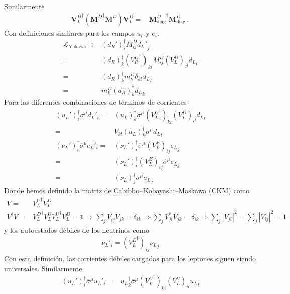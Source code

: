 \begin{frame}
 Similarmente
\begin{align}
  {\mathbf{V}_L^D}^\dagger \left({\mathbf{M}^D}^\dagger\mathbf{M}^D\right)\mathbf{V}_L^D=& 
  {\mathbf{M}^D_{\text{diag}}}^\dagger{\mathbf{M}^D_{\text{diag}}}\,,
\end{align}
Con definiciones similares para los campos $u_i$ y $e_i$.
\begin{align}
\mathcal{L}_{\text{Yukawa}}\supset&(d_R')^{\dagger}_iM^D_{ij} {d_L'}_j\nonumber\\
=&(d_R)^{\dagger}_k({V^D_R}^\dagger)_{ki}M^D_{ij}(V^D_L)_{jl} {d_L}_l\nonumber\\
=&(d_R)^{\dagger}_km^D_k\delta_{kl} {d_L}_l\nonumber\\
=&m^D_k(d_R)^{\dagger}_k{d_L}_k
\end{align}
Para las diferentes combinaciones de términos de corrientes
\begin{align}
  (u_L')^{\dagger}_i \overline{\sigma}^\mu{d_L}'_i=&(u_L)^{\dagger}_k\overline{\sigma}^\mu({V^U_L}^\dagger)_{ki}(V^D_L)_{il} {d_L}_l\nonumber\\
  =&V_{kl}(u_L)^{\dagger}_k\overline{\sigma}^\mu{d_L}_l\nonumber\\
  (\nu_L')^{\dagger}_i\overline{\sigma}^\mu {e_L}'_i=&(\nu_L')^{\dagger}_i\overline{\sigma}^\mu(V^E_L)_{ij} {e_L}_j\nonumber\\
  =&(\nu_L')^{\dagger}_i(V^E_L)_{ij}\overline{\sigma}^\mu {e_L}_j\nonumber\\
  =&(\nu_L)^{\dagger}_j\overline{\sigma}^\mu{e_L}_j
\end{align}
Donde hemos definido la matriz de Cabibbo--Kobayashi--Maskawa (CKM) como
\begin{align}
  \label{eq:230qft}
  V=&{V^U_L}^\dagger V^D_L\nonumber\\
  V^\dagger V=&{V^D_L}^\dagger{V^U_L}{V^U_L}^\dagger V^D_L=\mathbf{1}\Rightarrow \sum_jV^\dagger_{ij}V_{jk}=\delta_{ik}\Rightarrow\sum_jV^*_{ji}V_{jk}=\delta_{ik}\Rightarrow\sum_j|V_{ji}|^2=\sum_j|V_{ij}|^2=1
\end{align}
y los autoestados débiles de los neutrinos como
\begin{align}
  {\nu_L}'_i=({V^E_L}^\dagger)_{ij}{\nu_L}_j
\end{align}
Con esta definición, las corrientes débiles cargadas para los leptones siguen siendo universales. Similarmente
\begin{align}
   (u_L')^{\dagger}_i \overline{\sigma}^\mu{u_L}'_i=&{u_L}^{\dagger}_k\overline{\sigma}^\mu({V^U_L}^\dagger)_{ki}(V^U_L)_{il} {u_L}_l\nonumber\\

\end{align}
\end{frame}
